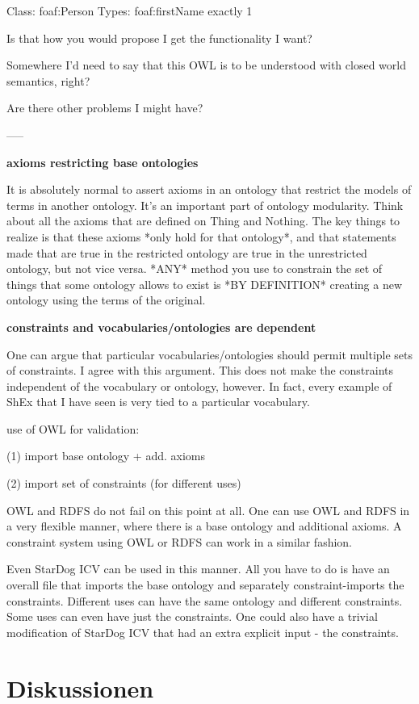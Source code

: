 \documentclass{llncs}
\begin{document}
    Class: foaf:Person
       Types: foaf:firstName exactly 1
 
Is that how you would propose I get the functionality I want?
 
Somewhere I'd need to say that this OWL is to be understood with closed
world semantics, right?
 
Are there other problems I might have?
 
-----

\textbf{axioms restricting base ontologies}

It is absolutely normal to assert axioms in an ontology that restrict the models of terms in another ontology. It's an important part of ontology modularity.
Think about all the axioms that are defined on Thing and Nothing.
The key things to realize is that these axioms *only hold for that ontology*, and that statements made that are true in the restricted ontology are true in the unrestricted ontology, but not vice versa.  
*ANY* method you use to constrain the set of things that some ontology allows to exist is *BY DEFINITION* creating a new ontology using the terms of the original.

\textbf{constraints and vocabularies/ontologies are dependent}

One can argue that particular vocabularies/ontologies should permit multiple sets of constraints.  I agree with this argument.  This does not make the constraints independent of the vocabulary or ontology, however.  In fact, every example of ShEx that I have seen is very tied to a particular vocabulary.

use of OWL for validation:

(1) import base ontology + add. axioms

(2) import set of constraints (for different uses)

OWL and RDFS do not fail on this point at all.  One can use OWL and RDFS in a very flexible manner, where there is a base ontology and additional axioms.  A constraint system using OWL or RDFS can work in a similar fashion.

Even StarDog ICV can be used in this manner.  All you have to do is have an overall file that imports the base ontology and separately constraint-imports the constraints.  Different uses can have the same ontology and different constraints.  Some uses can even have just the constraints.  One could also have a trivial modification of StarDog ICV that had an extra explicit input - the constraints.

\section{Diskussionen}
\end{document}
